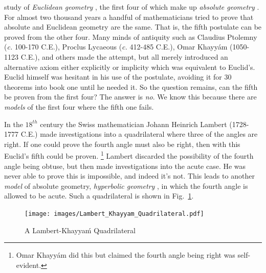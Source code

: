         study of \textit{Euclidean geometry}%
        , the first four of which make up
        \textit{absolute geometry}%
        . For almost two thousand years a handful of
        mathematicians tried to prove that absolute and Euclidean geometry are
        the same. That is, the fifth postulate can be proved from
        the other four. Many minds of antiquity such as Claudius Ptolemny%
         (\textit{c.} 100-170 C.E.), Proclus
        Lycaeous (\textit{c.} 412-485 C.E.), Omar
        Khayy\'{a}m (1050-1123 C.E.), and others
        made the attempt, but all merely introduced an alternative axiom either
        explicitly or implicity which was equivalent to Euclid's. Euclid himself
        was hesitant in his use of the postulate, avoiding it for 30 theorems
        into book one until he needed it. So the question remains, can the fifth
        be proven from the first four? The answer is \textit{no}. We know this
        because there are \textit{models} of the first four where
        the fifth one fails.
        \par\hfill\par
        In the $18^{th}$ century the Swiss mathematician Johann Heinrich
        Lambert (1728-1777 C.E.) made
        investigations into a quadrilateral where three of the angles are right.
        If one could prove the fourth angle must also be right, then with this
        Euclid's fifth could be proven.%
        \footnote{%
            Omar Khayy\'{a}m did this but claimed the fourth angle
            being right was self-evident.
        }
        Lambert discarded the possibility of the fourth angle being obtuse, but
        then made investigations into the acute case. He was never able to prove
        this is impossible, and indeed it's not. This leads to another
        \textit{model} of absolute geometry, \textit{hyperbolic geometry}%
        , in which the fourth angle is allowed to be
        acute. Such a quadrilateral is shown in
        Fig.~\ref{fig:Lambert_Khayyam_Quadrilateral}.
        \begin{figure}[H]
            \centering
            \captionsetup{type=figure}
            \texttt{[image: images/Lambert\_Khayyam\_Quadrilateral.pdf]}
            \caption{A Lambert-Khayya\'{m} Quadrilateral}
            \label{fig:Lambert_Khayyam_Quadrilateral}
        \end{figure}
